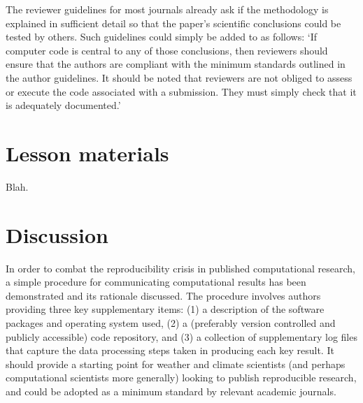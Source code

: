 The reviewer guidelines for most journals already ask if the methodology is explained in sufficient detail so that the paper's scientific conclusions could be tested by others. Such guidelines could simply be added to as follows: `If computer code is central to any of those conclusions, then reviewers should ensure that the authors are compliant with the minimum standards outlined in the author guidelines. It should be noted that reviewers are not obliged to assess or execute the code associated with a submission. They must simply check that it is adequately documented.'   



\section{Lesson materials}\label{s:reproducibility_lessons}

Blah.



\section{Discussion}

In order to combat the reproducibility crisis in published computational research, a simple procedure for communicating computational results has been demonstrated and its rationale discussed. The procedure involves authors providing three key supplementary items: (1) a description of the software packages and operating system used, (2) a (preferably version controlled and publicly accessible) code repository, and (3) a collection of supplementary log files that capture the data processing steps taken in producing each key result. It should provide a starting point for weather and climate scientists (and perhaps computational scientists more generally) looking to publish reproducible research, and could be adopted as a minimum standard by relevant academic journals.


